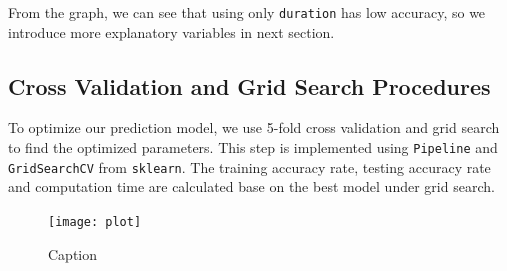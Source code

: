 \documentclass[11pt,a4paper]{article}
\begin{document}
    \noindent
    From the graph, we can see that using only \texttt{duration} has low accuracy, so we introduce more explanatory variables in next section.
    
    
    
    \subsection{Cross Validation and Grid Search Procedures}
    To optimize our prediction model, we use 5-fold cross validation and grid search to find the optimized parameters. This step is implemented using \texttt{Pipeline} and \texttt{GridSearchCV} from \texttt{sklearn}. The training accuracy rate, testing accuracy rate and computation time are calculated base on the best model under grid search. \\
    
    
    \begin{figure}
        \centering
        \texttt{[image: plot]}
        \caption{Caption}
        \label{fig:my_label}
    \end{figure}
    
    






\end{document}
